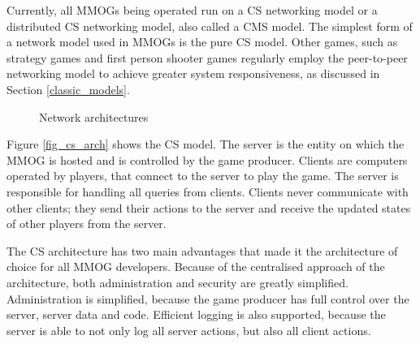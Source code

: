 \documentclass[journal,oneside,a4paper,onecolumn]{IEEEtran}
\begin{document}
Currently, all MMOGs being operated run on a \ac{CS} networking model or a distributed \ac{CS} networking model, also called a \ac{CMS} model. The simplest form of a network model used in MMOGs is the pure \ac{CS} model. Other games, such as strategy games and first person shooter games regularly employ the peer-to-peer networking model to achieve greater system responsiveness, as discussed in Section \ref{classic_models}.

\begin{figure}[htbp]
\centering
\caption{Network architectures}
\end{figure}
%
Figure \ref{fig_cs_arch} shows the \ac{CS} model. The server is the entity on which the MMOG is hosted and is controlled by the game producer. Clients are computers operated by players, that connect to the server to play the game. The server is responsible for handling all queries from clients. Clients never communicate with other clients; they send their actions to the server and receive the updated states of other players from the server.

The \ac{CS} architecture has two main advantages that made it the architecture of choice for all MMOG developers. Because of the centralised approach of the architecture, both administration and security are greatly simplified. Administration is simplified, because the game producer has full control over the server, server data and code. Efficient logging is also supported, because the server is able to not only log all server actions, but also all client actions.
\end{document}
